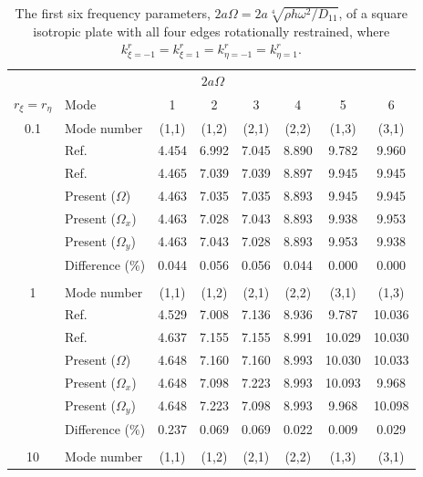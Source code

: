 \documentclass[preprint,12pt]{elsarticle}
\begin{document}
\begin{table}[!htbp]
	\centering
	\caption{The first six frequency parameters, \(2a\Omega = 2a\sqrt[4]{\rho h \omega^2/D_{11}}\), of a square isotropic plate with all four edges rotationally restrained, where \(k^r_{\xi=-1} = k^r_{\xi=1} = k^r_{\eta=-1} = k^r_{\eta=1}\).}  
	\begin{tabular}{c l c c c c c c}
		\toprule
		\multicolumn{1}{c}{} & \multicolumn{6}{c}{$2a\Omega$} \\ 
		\cmidrule(lr){3-8}
		$r_{\xi}=r_{\eta}$ & Mode & 1 & 2 & 3 & 4 & 5 & 6 \\ 
		\midrule
		0.1 & Mode number   & (1,1) & (1,2) & (2,1) & (2,2) & (1,3) & (3,1) \\
		& Ref.\Citealp{mukhopadhyay1979free} & 4.454 & 6.992 & 7.045 & 8.890  & 9.782  & 9.960 \\
		& Ref.\Citealp{zhang2019new} & 4.465 & 7.039 & 7.039 &8.897  &9.945& 9.945 \\
		& Present ($\Omega$)   & 4.463    & 7.035     & 7.035      &8.893     & 9.945     & 9.945   \\
		& Present ($\Omega_x$)   & 4.463     & 7.028     & 7.043     & 8.893     & 9.938       & 9.953  \\
		& Present ($\Omega_y$)   & 4.463    &7.043     &  7.028       & 8.893   &  9.953    & 9.938 \\ 
		&Difference (\%)& 0.044     & 0.056      & 0.056      & 0.044     &  0.000     & 0.000
		\\
		\\
		1 & Mode number   &  (1,1) & (1,2) & (2,1) & (2,2) & (3,1) & (1,3) \\
		& Ref.\Citealp{mukhopadhyay1979free} & 4.529& 7.008 &7.136 &8.936& 9.787& 10.036 \\
		& Ref.\Citealp{zhang2019new} & 4.637 &7.155 & 7.155 & 8.991 & 10.029 & 10.030 \\
		& Present ($\Omega$)   & 4.648      & 7.160   & 7.160     & 8.993    &   10.030   & 10.033   \\
		& Present ($\Omega_x$)   & 4.648     & 7.098      &7.223     & 8.993     &   10.093    & 9.968  \\
		& Present ($\Omega_y$)   & 4.648     & 7.223     & 7.098       & 8.993     &   9.968     & 10.098
		\\ 
		&Difference (\%)& 0.237    & 0.069      & 0.069      & 0.022     &  0.009     &0.029
		\\
		\\
		10 & Mode number   &  (1,1) & (1,2) & (2,1) & (2,2) & (1,3) & (3,1) \\

\end{tabular}
\end{table}
\end{document}

